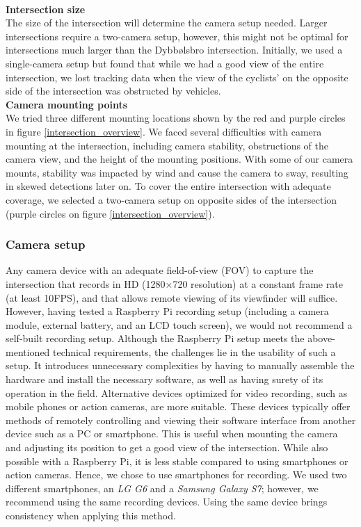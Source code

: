 \ \\

\textbf{Intersection size} \\
The size of the intersection will determine the camera setup needed. Larger intersections require a two-camera setup, 
however, this might not be optimal for intersections much larger than the Dybbølsbro intersection. 
Initially, we used a single-camera setup but found that while we had a good view of the entire intersection, 
we lost tracking data when the view of the cyclists' on the opposite side of the intersection was obstructed by vehicles.
\ \\

\textbf{Camera mounting points} \\
We tried three different mounting locations shown by the red and purple circles in figure \ref{intersection_overview}. 
We faced several difficulties with camera mounting at the intersection, including camera stability, 
obstructions of the camera view, and the height of the mounting positions. 
With some of our camera mounts, stability was impacted by wind and cause the camera to sway, resulting in skewed detections later on.
To cover the entire intersection with adequate coverage, we selected a two-camera setup on opposite sides of the intersection 
(purple circles on figure \ref{intersection_overview}).

\subsubsection{Camera setup}
Any camera device with an adequate field-of-view (FOV) to capture the intersection that records in HD (1280×720 resolution) at a constant 
frame rate (at least 10FPS), and that allows remote viewing of its viewfinder will suffice. 
However, having tested a Raspberry Pi recording setup (including a camera module, external battery, and an LCD touch screen), 
we would not recommend a self-built recording setup. Although the Raspberry Pi setup meets the above-mentioned technical requirements, 
the challenges lie in the usability of such a setup. 
It introduces unnecessary complexities by having to manually assemble the hardware and install the necessary software, as well as 
having surety of its operation in the field.
Alternative devices optimized for video recording, such as mobile phones or action cameras, are more suitable.
These devices typically offer methods of remotely controlling and viewing their software interface from 
another device such as a PC or smartphone. 
This is useful when mounting the camera and adjusting its position to get a good view of the intersection. 
While also possible with a Raspberry Pi, it is less stable compared to using smartphones or action cameras.
Hence, we chose to use smartphones for recording. We used two different smartphones, an \textit{LG G6} and a \textit{Samsung Galaxy S7}; however, we recommend using the same recording devices. Using the same device brings consistency when applying this method.

